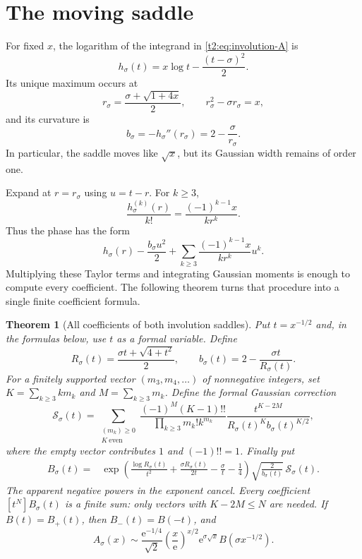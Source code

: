 \documentclass[11pt,openany]{book}
\numberwithin{equation}{chapter}
\theoremstyle{plain}
\newtheorem{theorem}{Theorem}[chapter]
\theoremstyle{definition}
\theoremstyle{remark}
\newcommand{\ee}{\mathrm e}
\begin{document}
\section{The moving saddle}

For fixed $x$, the logarithm of the integrand in \eqref{t2:eq:involution-A} is
\[
 h_\sigma(t)=x\log t-\frac{(t-\sigma)^2}{2}.
\]
Its unique maximum occurs at
\begin{equation}
 r_\sigma=\frac{\sigma+\sqrt{1+4x}}2,
 \qquad r_\sigma^2-\sigma r_\sigma=x,
 \label{t2:eq:involution-saddle}
\end{equation}
and its curvature is
\begin{equation}
 b_\sigma=-h_\sigma''(r_\sigma)
          =2-\frac{\sigma}{r_\sigma}.
 \label{t2:eq:involution-curvature}
\end{equation}
In particular, the saddle moves like $\sqrt x$, but its Gaussian width remains of order one.

Expand at $r=r_\sigma$ using $u=t-r$. For $k\ge3$,
\[
 \frac{h_\sigma^{(k)}(r)}{k!}
       =\frac{(-1)^{k-1}x}{kr^k}.
\]
Thus the phase has the form
\[
 h_\sigma(r)-\frac{b_\sigma u^2}{2}
       +\sum_{k\ge3}\frac{(-1)^{k-1}x}{kr^k}u^k.
\]
Multiplying these Taylor terms and integrating Gaussian moments is enough to compute every coefficient. The following theorem turns that procedure into a single finite coefficient formula.

\begin{theorem}[All coefficients of both involution saddles]
\label{t2:thm:involution-coeff}
Put $t=x^{-1/2}$ and, in the formulas below, use $t$ as a formal variable. Define
\begin{equation}
 R_\sigma(t)=\frac{\sigma t+\sqrt{4+t^2}}2,
 \qquad b_\sigma(t)=2-\frac{\sigma t}{R_\sigma(t)}.
 \label{t2:eq:involution-R}
\end{equation}
For a finitely supported vector $(m_3,m_4,\ldots)$ of nonnegative integers, set
$K=\sum_{k\ge3}km_k$ and $M=\sum_{k\ge3}m_k$. Define the formal Gaussian correction
\begin{equation}
 \mathcal S_\sigma(t)=
 \sum_{\substack{(m_k)\ge0\\K\ \mathrm{even}}}
 \frac{(-1)^M(K-1)!!}{\prod_{k\ge3}m_k!k^{m_k}}
 \frac{t^{K-2M}}{R_\sigma(t)^K b_\sigma(t)^{K/2}},
 \label{t2:eq:involution-S}
\end{equation}
where the empty vector contributes $1$ and $(-1)!!=1$. Finally put
\begin{align}
 B_\sigma(t)={}&
 \exp\!\left(\frac{\log R_\sigma(t)}{t^2}
       +\frac{\sigma R_\sigma(t)}{2t}-\frac\sigma t-\frac14\right)
 \sqrt{\frac2{b_\sigma(t)}}\,\mathcal S_\sigma(t).
 \label{t2:eq:involution-B}
\end{align}
The apparent negative powers in the exponent cancel. Every coefficient $[t^N]B_\sigma(t)$ is a finite sum: only vectors with $K-2M\le N$ are needed. If $B(t)=B_+(t)$, then $B_-(t)=B(-t)$, and
\begin{equation}
 A_\sigma(x)\sim
 \frac{\ee^{-1/4}}{\sqrt2}\left(\frac{x}{\ee}\right)^{x/2}
          \ee^{\sigma\sqrt x}B(\sigma x^{-1/2}).
 \label{t2:eq:involution-saddle-expansion}
\end{equation}
\end{theorem}
\end{document}
